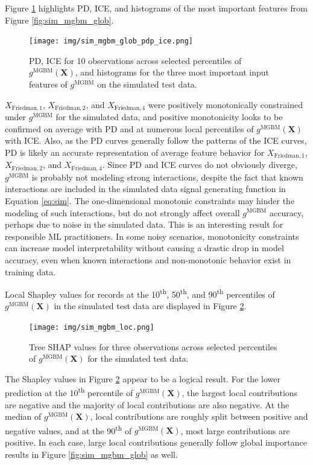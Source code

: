 \documentclass[information,article,submit,moreauthors,pdftex]{definitions/mdpi}
\begin{document}
Figure \ref{fig:sim_mgbm_glob_pdp_ice} highlights PD, ICE, and histograms of the most important features from Figure \ref{fig:sim_mgbm_glob}. 

\begin{figure}[htb]
	\centering
	\texttt{[image: img/sim\_mgbm\_glob\_pdp\_ice.png]}
	\caption{PD, ICE for 10 observations across selected percentiles of $g^\text{MGBM}(\mathbf{X})$, and histograms for the three most important input features of $g^\text{MGBM}$ on the simulated test data.}
	\label{fig:sim_mgbm_glob_pdp_ice}
\end{figure}   

$X_{\text{Friedman},1}$, $X_{\text{Friedman},2}$, and $X_{\text{Friedman},4}$ were positively monotonically constrained under $g^\text{MGBM}$ for the simulated data, and positive monotonicity looks to be confirmed on average with PD and at numerous local percentiles of $g^\text{MGBM}(\mathbf{X})$ with ICE. Also, as the PD curves generally follow the patterns of the ICE curves, PD is likely an accurate representation of average feature behavior for $X_{\text{Friedman},1}$, $X_{\text{Friedman},2}$, and $X_{\text{Friedman},4}$. Since PD and ICE curves do not obviously diverge, $g^\text{MGBM}$ is probably not modeling strong interactions, despite the fact that known interactions are included in the simulated data signal generating function in Equation \ref{eq:sim}. The one-dimensional monotonic constraints may hinder the modeling of such interactions, but do not strongly affect overall $g^\text{MGBM}$ accuracy, perhaps due to noise in the simulated data. This is an interesting result for responsible ML practitioners. In some noisy scenarios, monotonicity constraints can increase model interpretability without causing a drastic drop in model accuracy, even when known interactions and non-monotonic behavior exist in training data.

Local Shapley values for records at the 10\textsuperscript{th}, 50\textsuperscript{th}, and 90\textsuperscript{th} percentiles of $g^\text{MGBM}(\mathbf{X})$ in the simulated test data are displayed in Figure \ref{fig:sim_mgbm_loc}. 

\begin{figure}[htb]
	\centering
	\texttt{[image: img/sim\_mgbm\_loc.png]}
	\caption{Tree SHAP values for three observations across selected percentiles of $g^\text{MGBM}(\mathbf{X})$ for the simulated test data.}
	\label{fig:sim_mgbm_loc}
\end{figure}   

\noindent The Shapley values in Figure \ref{fig:sim_mgbm_loc} appear to be a logical result. For the lower prediction at the 10\textsuperscript{th} percentile of $g^\text{MGBM}(\mathbf{X})$, the largest local contributions are negative and the majority of local contributions are also negative. At the median of $g^\text{MGBM}(\mathbf{X})$, local contributions are roughly split between positive and negative values, and at the 90\textsuperscript{th} of $g^\text{MGBM}(\mathbf{X})$, most large contributions are positive. In each case, large local contributions generally follow global importance results in Figure \ref{fig:sim_mgbm_glob} as well.
\end{document}
